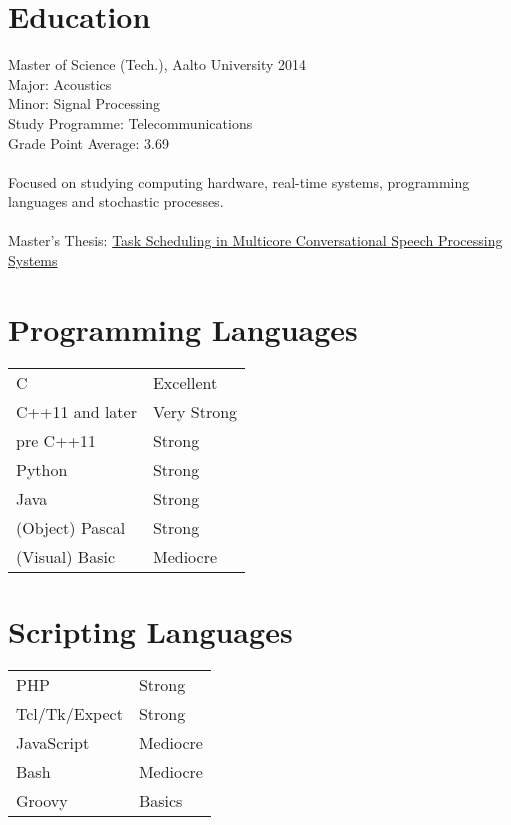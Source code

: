 \documentclass[12pt]{article}
\begin{document}
\section*{Education}

\large{Master of Science (Tech.), Aalto University 2014}\\
\normalsize{
Major: Acoustics\\
Minor: Signal Processing\\
Study Programme: Telecommunications\\
Grade Point Average: 3.69\\
\\
Focused on studying computing hardware, real-time systems, programming 
languages and stochastic processes.\\
\\
Master's Thesis:
\href{https://aaltodoc.aalto.fi/bitstream/handle/123456789/14402/master_
Lindroos_Michele_2014.pdf?sequence=1}
{Task Scheduling in Multicore Conversational Speech Processing Systems}
}


\section*{Programming Languages}

\begin{tabular}{ll}
C & Excellent\\
C++11 and later & Very Strong\\
pre C++11 & Strong\\
Python & Strong\\
Java & Strong\\
(Object) Pascal & Strong\\
(Visual) Basic & Mediocre
\end{tabular}


\section*{Scripting Languages}

\begin{tabular}{ll}
PHP & Strong\\
Tcl/Tk/Expect & Strong\\
JavaScript & Mediocre\\
Bash & Mediocre\\
Groovy & Basics\\
\end{tabular}
\end{document}
